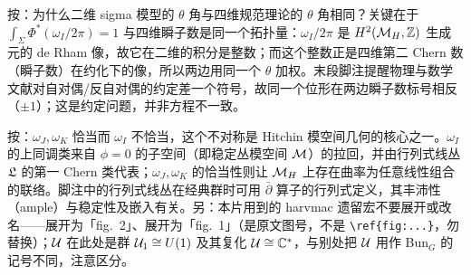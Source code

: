 \begin{yizhu}[易错点]
按：为什么二维 sigma 模型的 $\theta$ 角与四维规范理论的 $\theta$ 角相同？关键在于 $\int_\Sigma\Phi^*(\omega_I/2\pi)=1$ 与四维瞬子数是同一个拓扑量：$\omega_I/2\pi$ 是 $H^2(\MH,\Bbb{Z})$ 生成元的 de Rham 像，故它在二维的积分是整数；而这个整数正是四维第二 Chern 数（瞬子数）在约化下的像，所以两边用同一个 $\theta$ 加权。末段脚注提醒物理与数学文献对自对偶/反自对偶的约定差一个符号，故同一个位形在两边瞬子数标号相反（$\pm 1$）；这是约定问题，并非方程不一致。
\end{yizhu}

\begin{yizhu}[含糊点拨]
按：$\omega_J,\omega_K$ 恰当而 $\omega_I$ 不恰当，这个不对称是 Hitchin 模空间几何的核心之一。$\omega_I$ 的上同调类来自 $\phi=0$ 的子空间（即稳定丛模空间 $\M$）的拉回，并由行列式线丛 $\frak L$ 的第一 Chern 类代表；$\omega_J,\omega_K$ 的恰当性则让 $\MH$ 上存在曲率为任意线性组合的联络。脚注中的行列式线丛在经典群时可用 $\bar\partial$ 算子的行列式定义，其丰沛性（ample）与稳定性及嵌入有关。另：本片用到的 harvmac 遗留宏不要展开或改名——\xunko 展开为「fig.~2」、\zunko 展开为「fig.~1」（是原文图号，不是 \verb|\ref{fig:...}|，勿替换）；$\CU$ 在此处是群 $\CU_1\cong U(1)$ 及其复化 $\CU\cong \Bbb{C}^*$，与别处把 $\CU$ 用作 Bun$_G$ 的记号不同，注意区分。
\end{yizhu}

